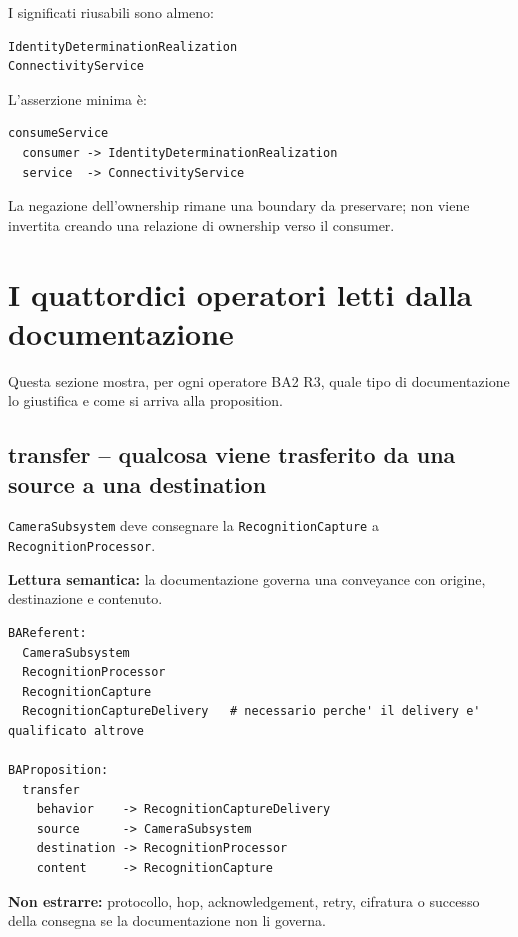 \documentclass[11pt,a4paper]{article}
\newcommand{\code}[1]{\nolinkurl{#1}}
\begin{document}
I significati riusabili sono almeno:

\begin{lstlisting}
IdentityDeterminationRealization
ConnectivityService
\end{lstlisting}

L'asserzione minima è:

\begin{lstlisting}
consumeService
  consumer -> IdentityDeterminationRealization
  service  -> ConnectivityService
\end{lstlisting}

La negazione dell'ownership rimane una boundary da preservare; non viene invertita creando una relazione di ownership verso il consumer.

\section{I quattordici operatori letti dalla documentazione}

Questa sezione mostra, per ogni operatore BA2 R3, quale tipo di documentazione lo giustifica e come si arriva alla proposition.

\subsection{transfer -- qualcosa viene trasferito da una source a una destination}

\begin{examplebox}
\code{CameraSubsystem} deve consegnare la \code{RecognitionCapture} a \code{RecognitionProcessor}.
\end{examplebox}

\textbf{Lettura semantica:} la documentazione governa una conveyance con origine, destinazione e contenuto.

\begin{lstlisting}
BAReferent:
  CameraSubsystem
  RecognitionProcessor
  RecognitionCapture
  RecognitionCaptureDelivery   # necessario perche' il delivery e' qualificato altrove

BAProposition:
  transfer
    behavior    -> RecognitionCaptureDelivery
    source      -> CameraSubsystem
    destination -> RecognitionProcessor
    content     -> RecognitionCapture
\end{lstlisting}

\textbf{Non estrarre:} protocollo, hop, acknowledgement, retry, cifratura o successo della consegna se la documentazione non li governa.
\end{document}
